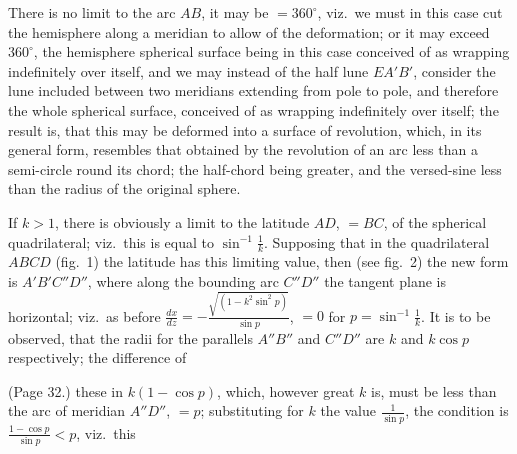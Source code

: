 \documentclass[11pt,a4paper]{article}
\begin{document}
There is no limit to the arc $AB$, it may be $= 360^\circ$, viz.\ we must in this case cut the hemisphere along a meridian to allow of the deformation; or it may exceed $360^\circ$, the hemisphere spherical surface being in this case conceived of as wrapping indefinitely over itself, and we may instead of the half lune $EA'B'$, consider the lune included between two meridians extending from pole to pole, and therefore the whole spherical surface, conceived of as wrapping indefinitely over itself; the result is, that this may be deformed into a surface of revolution, which, in its general form, resembles that obtained by the revolution of an arc less than a semi-circle round its chord; the half-chord being greater, and the versed-sine less than the radius of the original sphere.

If $k > 1$, there is obviously a limit to the latitude $AD$, $= BC$, of the spherical quadrilateral; viz.\ this is equal to $\sin^{-1} \frac{1}{k}$. Supposing that in the quadrilateral $ABCD$ (fig.\ 1) the latitude has this limiting value, then (see fig.~2) the new form is $A'B'C''D''$, where along the bounding arc $C''D''$ the tangent plane is horizontal; viz.\ as before $\frac{dx}{dz} = -\frac{\sqrt{(1 - k^2 \sin^2 p)}}{\sin p}$, $= 0$ for $p = \sin^{-1} \frac{1}{k}$. It is to be observed, that the radii for the parallels $A''B''$ and $C''D''$ are $k$ and $k \cos p$ respectively; the difference of

\bigskip

\noindent (Page 32.) these in $k(1 - \cos p)$, which, however great $k$ is, must be less than the arc of meridian $A''D''$, $= p$; substituting for $k$ the value $\frac{1}{\sin p}$, the condition is $\frac{1 - \cos p}{\sin p} < p$, viz.\ this
\end{document}
